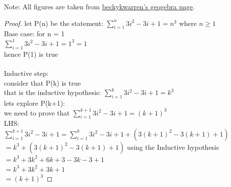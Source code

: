 \documentclass[a4paper]{exam}
\begin{document}
\begin{questions}
  Note: All figures are taken from \href{https://www.geogebra.org/m/cnqdjcph}{beckykwarren's geogebra page}.

  \begin{solution}
    \begin{proof}
      let P(n) be the statement: $\sum^{n}_{i=1}3i^2-3i+1 = n^3$ where $n \geq 1$\\
      Base case: for n = 1\\
      $\sum^{1}_{i=1}3i^2-3i+1 = 1^3 = 1$\\
      hence P(1) is true\\\\
      Inductive step:\\
      consider that P(k) is true\\
      that is the inductive hypothesis: $\sum^{k}_{i=1}3i^2-3i+1 = k^3$\\
      lets explore P(k+1):\\
      we need to prove that $\sum^{k+1}_{i=1}3i^2-3i+1 = (k+1)^3$ \\
      LHS:\\
      $\sum^{k+1}_{i=1}3i^2-3i+1 = \sum^{k}_{i=1}3i^2-3i+1 + (3(k+1)^2-3(k+1)+1)$\\
      $=k^3 + (3(k+1)^2-3(k+1)+1)$ using the Inductive hypothesis\\
      $= k^3+3k^2+6k+3-3k-3+1$\\
      $= k^3+3k^2+3k+1$\\
      $= (k+1)^3$ 


    \end{proof}
  \end{solution}


\end{questions}
\end{document}
